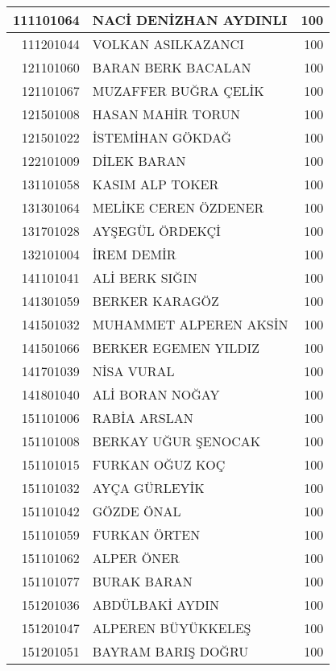 \documentclass[12pt]{article}
\begin{document}
\begin{longtable}{||r||l||r||}
    \midrule
    111101064 & NACİ DENİZHAN AYDINLI & 100 \\
    \midrule
    111201044 & VOLKAN ASILKAZANCI & 100 \\
    \midrule
    121101060 & BARAN BERK BACALAN & 100 \\
    \midrule
    121101067 & MUZAFFER BUĞRA ÇELİK & 100 \\
    \midrule
    121501008 & HASAN MAHİR TORUN & 100 \\
    \midrule
    121501022 & İSTEMİHAN GÖKDAĞ & 100 \\
    \midrule
    122101009 & DİLEK BARAN & 100 \\
    \midrule
    131101058 & KASIM ALP TOKER & 100 \\
    \midrule
    131301064 & MELİKE CEREN ÖZDENER & 100 \\
    \midrule
    131701028 & AYŞEGÜL ÖRDEKÇİ & 100 \\
    \midrule
    132101004 & İREM DEMİR & 100 \\
    \midrule
    141101041 & ALİ BERK SIĞIN & 100 \\
    \midrule
    141301059 & BERKER KARAGÖZ & 100 \\
    \midrule
    141501032 & MUHAMMET ALPEREN AKSİN & 100 \\
    \midrule
    141501066 & BERKER EGEMEN YILDIZ & 100 \\
    \midrule
    141701039 & NİSA VURAL & 100 \\
    \midrule
    141801040 & ALİ BORAN NOĞAY & 100 \\
    \midrule
    151101006 & RABİA ARSLAN & 100 \\
    \midrule
    151101008 & BERKAY UĞUR ŞENOCAK & 100 \\
    \midrule
    151101015 & FURKAN OĞUZ KOÇ & 100 \\
    \midrule
    151101032 & AYÇA GÜRLEYİK & 100 \\
    \midrule
    151101042 & GÖZDE ÖNAL & 100 \\
    \midrule
    151101059 & FURKAN ÖRTEN & 100 \\
    \midrule
    151101062 & ALPER ÖNER & 100 \\
    \midrule
    151101077 & BURAK BARAN & 100 \\
    \midrule
    151201036 & ABDÜLBAKİ AYDIN & 100 \\
    \midrule
    151201047 & ALPEREN BÜYÜKKELEŞ & 100 \\
    \midrule
    151201051 & BAYRAM BARIŞ DOĞRU & 100 \\

\end{longtable}
\end{document}
